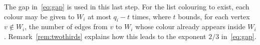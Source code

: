 The gap in~\eqref{eq:gap} is used in this last step.
For the list colouring to exist, each colour may be given to $W_i$ at most $q_i-t$ times, where $t$ bounds, for each vertex $v\notin W_i$, the number of edges from $v$ to $W_i$ whose colour already appears inside $W_i$.
Remark~\ref{rem:twothirds} explains how this leads to the exponent $2/3$ in~\eqref{eq:gap}.

